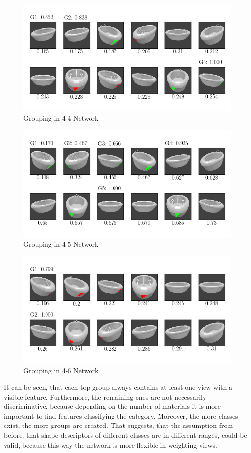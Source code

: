 \begin{figure}
	\centering
	\includegraphics[trim=10 20 10 20, clip]{images/mn-sl-4-4-20/bathtub_0107_3_grouping.png}
	\caption{Grouping in 4-4 Network}
	\label{fig:grouping-4-4}
\end{figure}
\begin{figure}
	\centering
	\includegraphics[trim=10 20 10 20, clip]{images/mn-sl-4-5-20/bathtub_0107_4_grouping.png}
	\caption{Grouping in 4-5 Network}
	\label{fig:grouping-4-5}
\end{figure}
\begin{figure}
	\centering
	\includegraphics[trim=10 20 10 20, clip]{images/mn-sl-4-6-20/bathtub_0107_5_grouping.png}
	\caption{Grouping in 4-6 Network}
	\label{fig:grouping-4-6}
\end{figure}
It can be seen, that each top group always contains at least one view with a visible feature.
Furthermore, the remaining ones are not necessarily discriminative, because depending on the number of materials it is more important to find features classifying the category.
Moreover, the more classes exist, the more groups are created.
That suggests, that the assumption from before, that shape descriptors of different classes are in different ranges, could be valid, because this way the network is more flexible in weighting views.